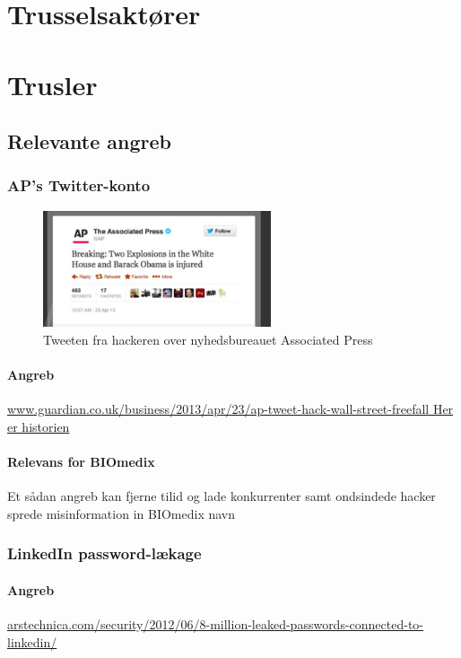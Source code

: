 \documentclass{article}
\begin{document}
\section{Trusselsaktører}

\section{Trusler}

\subsection{Relevante angreb}
\subsubsection{AP's Twitter-konto}

\begin{figure}
  \begin{center}
    \includegraphics[width=0.6\textwidth]{../Pictures/APTweet.jpg}
  \end{center}
  \caption{Tweeten fra hackeren over nyhedsbureauet Associated Press \cite{APTweetSource}}
\end{figure}

\paragraph{Angreb}
\url{www.guardian.co.uk/business/2013/apr/23/ap-tweet-hack-wall-street-freefall Her er historien}
\paragraph{Relevans for BIOmedix}

Et sådan angreb kan fjerne tilid og lade konkurrenter samt ondsindede hacker sprede misinformation in BIOmedix navn 
\subsubsection{LinkedIn password-lækage}

\paragraph{Angreb}
\url{arstechnica.com/security/2012/06/8-million-leaked-passwords-connected-to-linkedin/}
\end{document}
